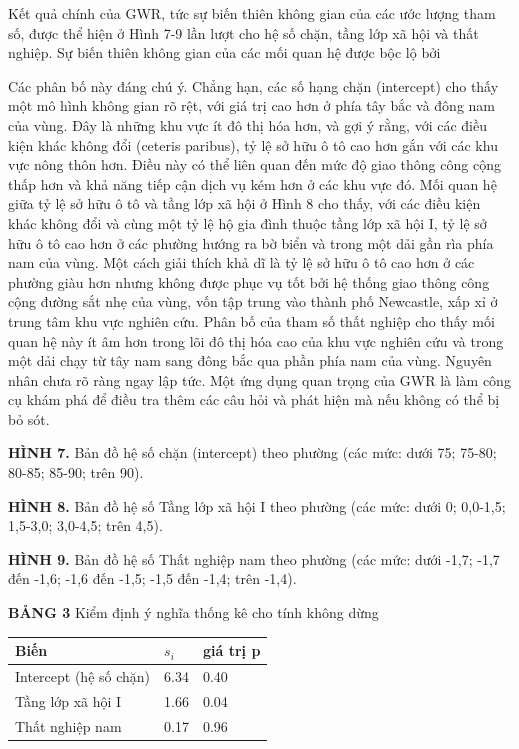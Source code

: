 Kết quả chính của GWR, tức sự biến thiên không gian của các ước lượng tham số, được thể hiện ở Hình 7-9 lần lượt cho hệ số chặn, tầng lớp xã hội và thất nghiệp. Sự biến thiên không gian của các mối quan hệ được bộc lộ bởi

Các phân bố này đáng chú ý. Chẳng hạn, các số hạng chặn (intercept) cho thấy một mô hình không gian rõ rệt, với giá trị cao hơn ở phía tây bắc và đông nam của vùng. Đây là những khu vực ít đô thị hóa hơn, và gợi ý rằng, với các điều kiện khác không đổi (ceteris paribus), tỷ lệ sở hữu ô tô cao hơn gắn với các khu vực nông thôn hơn. Điều này có thể liên quan đến mức độ giao thông công cộng thấp hơn và khả năng tiếp cận dịch vụ kém hơn ở các khu vực đó. Mối quan hệ giữa tỷ lệ sở hữu ô tô và tầng lớp xã hội ở Hình 8 cho thấy, với các điều kiện khác không đổi và cùng một tỷ lệ hộ gia đình thuộc tầng lớp xã hội I, tỷ lệ sở hữu ô tô cao hơn ở các phường hướng ra bờ biển và trong một dải gần rìa phía nam của vùng. Một cách giải thích khả dĩ là tỷ lệ sở hữu ô tô cao hơn ở các phường giàu hơn nhưng không được phục vụ tốt bởi hệ thống giao thông công cộng đường sắt nhẹ của vùng, vốn tập trung vào thành phố Newcastle, xấp xỉ ở trung tâm khu vực nghiên cứu. Phân bố của tham số thất nghiệp cho thấy mối quan hệ này ít âm hơn trong lõi đô thị hóa cao của khu vực nghiên cứu và trong một dải chạy từ tây nam sang đông bắc qua phần phía nam của vùng. Nguyên nhân chưa rõ ràng ngay lập tức. Một ứng dụng quan trọng của GWR là làm công cụ khám phá để điều tra thêm các câu hỏi và phát hiện mà nếu không có thể bị bỏ sót.

\textbf{HÌNH 7.} Bản đồ hệ số chặn (intercept) theo phường (các mức: dưới 75; 75-80; 80-85; 85-90; trên 90).

\textbf{HÌNH 8.} Bản đồ hệ số Tầng lớp xã hội I theo phường (các mức: dưới 0; 0,0-1,5; 1,5-3,0; 3,0-4,5; trên 4,5).

\textbf{HÌNH 9.} Bản đồ hệ số Thất nghiệp nam theo phường (các mức: dưới -1,7; -1,7 đến -1,6; -1,6 đến -1,5; -1,5 đến -1,4; trên -1,4).

\textbf{BẢNG 3} Kiểm định ý nghĩa thống kê cho tính không dừng

{\small
\begin{longtable}[]{@{}lll@{}}
\toprule\noalign{}
Biến & \(s_i\) & giá trị p \\
\midrule\noalign{}
\endhead
\bottomrule\noalign{}
\endlastfoot
Intercept (hệ số chặn) & 6.34 & 0.40 \\
Tầng lớp xã hội I & 1.66 & 0.04 \\
Thất nghiệp nam & 0.17 & 0.96 \\
\end{longtable}
}

